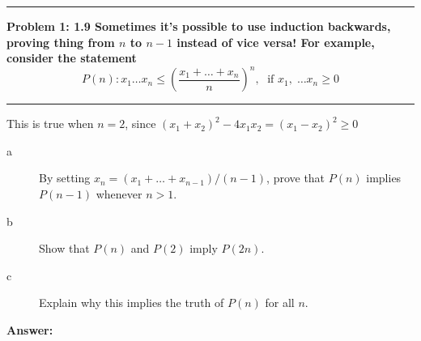 \documentclass[11pt]{article}
\newcommand\question[2]{\vspace{.25in}\hrule\textbf{#1: #2}\vspace{.5em}\hrule\vspace{.10in}}
\renewcommand\part[1]{\vspace{.10in}\textbf{#1}}
\begin{document}
\raggedright
\newcommand\NAME{Shiang-Yun Yang 楊翔雲}  %
\newcommand\ANDREWID{R04922067}     %
\newcommand\HWNUM{1}              %



\question{Problem 1}{1.9 Sometimes it's possible to use induction backwards, proving thing from $n$ to $n-1$ instead of vice versa! For example, consider the statement
$$P(n): x_1 \hdots x_n \le \left ( \frac{x_1 + \hdots + x_n}{n}\right )^n, \; \text{ if } x_1, \; \hdots x_n \ge 0$$
}

This is true when $n = 2$, since $(x_1 + x_2)^2 - 4 x_1 x_2 = (x_1 - x_2)^2 \ge 0$

\begin{description}
	\item[a] By setting $x_n = (x_1 + \hdots + x_{n-1})/(n-1)$, prove that $P(n)$ implies $P(n-1)$ whenever $n > 1$.
	\item[b] Show that $P(n)$ and $P(2)$ imply $P(2n)$.
	\item[c] Explain why this implies the truth of $P(n)$ for all $n$.
\end{description}


\part{Answer:} 
\end{document}

